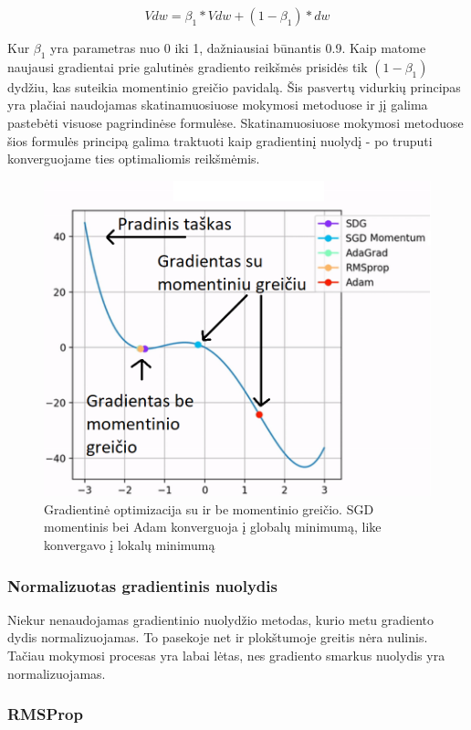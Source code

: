 \documentclass[a4paper, 12pt]{article}
\begin{document}
\begin{equation}
V d w=\beta_{1} * V d w+\left(1-\beta_{1}\right) * d w
\end{equation}

Kur $\beta_1$ yra parametras nuo 0 iki 1, dažniausiai būnantis 0.9. Kaip matome naujausi gradientai prie galutinės gradiento reikšmės prisidės tik $(1-\beta_1)$ dydžiu, kas suteikia momentinio greičio pavidalą. Šis pasvertų vidurkių principas yra plačiai naudojamas skatinamuosiuose mokymosi metoduose ir jį galima pastebėti visuose pagrindinėse formulėse. Skatinamuosiuose mokymosi metoduose šios formulės principą galima traktuoti kaip gradientinį nuolydį - po truputi konverguojame ties optimaliomis reikšmėmis.

\begin{figure}[h]
\centering
\includegraphics[width=.7\textwidth]{momentinisGreitis}
\caption{Gradientinė optimizacija su ir be momentinio greičio. SGD momentinis bei Adam konverguoja į globalų minimumą, like konvergavo į lokalų minimumą}
\label{momentinisGreitis}
\end{figure}


%
\subsubsection{Normalizuotas gradientinis nuolydis}
%

Niekur nenaudojamas gradientinio nuolydžio metodas, kurio metu gradiento dydis normalizuojamas. To pasekoje net ir plokštumoje greitis nėra nulinis. Tačiau mokymosi procesas yra labai lėtas, nes gradiento smarkus nuolydis yra normalizuojamas.

%
\subsubsection{RMSProp}
%
\end{document}
